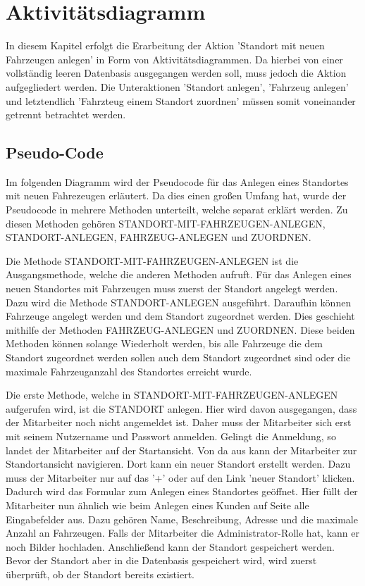 \chapter{Aktivitätsdiagramm}

In diesem Kapitel erfolgt die Erarbeitung der Aktion 'Standort mit neuen Fahrzeugen anlegen' in Form von Aktivitätsdiagrammen. Da hierbei von einer vollständig leeren Datenbasis ausgegangen werden soll, muss jedoch die Aktion aufgegliedert werden. Die Unteraktionen 'Standort anlegen', 'Fahrzeug anlegen' und letztendlich 'Fahrzteug einem Standort zuordnen' müssen somit voneinander getrennt betrachtet werden. 

\section{Pseudo-Code}
Im folgenden Diagramm wird der Pseudocode für das Anlegen eines Standortes mit neuen Fahrezeugen erläutert. Da dies einen großen Umfang hat, wurde der Pseudocode in mehrere Methoden unterteilt, welche separat erklärt werden. Zu diesen Methoden gehören STANDORT-MIT-FAHRZEUGEN-ANLEGEN, STANDORT-ANLEGEN, FAHRZEUG-ANLEGEN und ZUORDNEN.

Die Methode STANDORT-MIT-FAHRZEUGEN-ANLEGEN ist die Ausgangsmethode, welche die anderen Methoden aufruft. Für das Anlegen eines neuen Standortes mit Fahrzeugen muss zuerst der Standort angelegt werden. Dazu wird die Methode STANDORT-ANLEGEN ausgeführt. Daraufhin können Fahrzeuge angelegt werden und dem Standort zugeordnet werden. Dies geschieht mithilfe der Methoden FAHRZEUG-ANLEGEN und ZUORDNEN. Diese beiden Methoden können solange Wiederholt werden, bis alle Fahrzeuge die dem Standort zugeordnet werden sollen auch dem Standort zugeordnet sind oder die maximale Fahrzeuganzahl des Standortes erreicht wurde.


Die erste Methode, welche in STANDORT-MIT-FAHRZEUGEN-ANLEGEN aufgerufen wird, ist die STANDORT anlegen. Hier wird davon ausgegangen, dass der Mitarbeiter noch nicht angemeldet ist. Daher muss der Mitarbeiter sich erst mit seinem Nutzername und Passwort anmelden. Gelingt die Anmeldung, so landet der Mitarbeiter auf der Startansicht. Von da aus kann der Mitarbeiter zur Standortansicht navigieren. Dort kann ein neuer Standort erstellt werden. Dazu muss der Mitarbeiter nur auf das '+' oder auf den Link 'neuer Standort' klicken. Dadurch wird das Formular zum Anlegen eines Standortes geöffnet. Hier füllt der Mitarbeiter nun ähnlich wie beim Anlegen eines Kunden auf Seite
\pageref{code:KundeAnlegen} alle Eingabefelder aus. Dazu gehören Name, Beschreibung, Adresse und die maximale Anzahl an Fahrzeugen. Falls der Mitarbeiter die Administrator-Rolle hat, kann er noch Bilder hochladen. Anschließend kann der Standort gespeichert werden. Bevor der Standort aber in die Datenbasis gespeichert wird, wird zuerst überprüft, ob der Standort bereits existiert.\label{code:StandortAnlegen}

